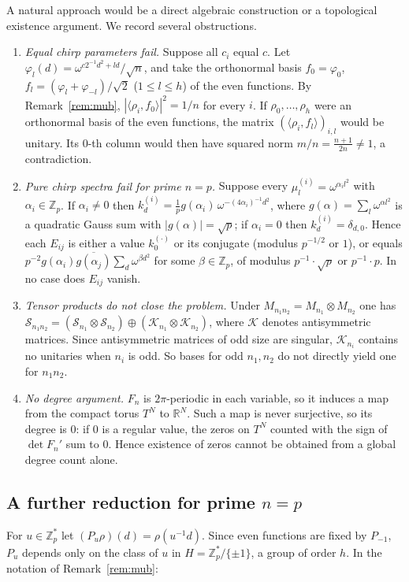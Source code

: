 \documentclass[11pt]{amsart}
\theoremstyle{definition}
\theoremstyle{remark}
\newcommand{\Z}{\mathbb{Z}}
\newcommand{\R}{\mathbb{R}}
\newcommand{\Sym}{\mathcal{S}}
\newcommand{\ip}[2]{\langle #1,#2\rangle}
\begin{document}
A natural approach would be a direct algebraic construction or a topological existence argument. We record several obstructions.

\begin{enumerate}
\item \emph{Equal chirp parameters fail.} Suppose all $c_i$ equal $c$. Let $\varphi_l(d)=\omega^{c2^{-1}d^2+ld}/\sqrt n$, and take the orthonormal basis $f_0=\varphi_0$, $f_l=(\varphi_l+\varphi_{-l})/\sqrt2$ ($1\le l\le h$) of the even functions. By Remark~\ref{rem:mub}, $|\ip{\rho_i}{f_0}|^2=1/n$ for every $i$. If $\rho_0,\dots,\rho_h$ were an orthonormal basis of the even functions, the matrix $(\ip{\rho_i}{f_l})_{i,l}$ would be unitary. Its $0$-th column would then have squared norm $m/n=\frac{n+1}{2n}\neq1$, a contradiction.
\item \emph{Pure chirp spectra fail for prime $n=p$.} Suppose every $\mu^{(i)}_l=\omega^{\alpha_il^2}$ with $\alpha_i\in\Z_p$. If $\alpha_i\ne0$ then $k^{(i)}_d=\frac1p g(\alpha_i)\,\omega^{-(4\alpha_i)^{-1}d^2}$, where $g(\alpha)=\sum_l\omega^{\alpha l^2}$ is a quadratic Gauss sum with $|g(\alpha)|=\sqrt p$; if $\alpha_i=0$ then $k^{(i)}_d=\delta_{d,0}$. Hence each $E_{ij}$ is either a value $k^{(\cdot)}_0$ or its conjugate (modulus $p^{-1/2}$ or $1$), or equals $p^{-2}g(\alpha_i)\overline{g(\alpha_j)}\sum_d\omega^{\beta d^2}$ for some $\beta\in\Z_p$, of modulus $p^{-1}\cdot\sqrt p$ or $p^{-1}\cdot p$. In no case does $E_{ij}$ vanish.
\item \emph{Tensor products do not close the problem.} Under $M_{n_1n_2}=M_{n_1}\otimes M_{n_2}$ one has $\Sym_{n_1n_2}=(\Sym_{n_1}\otimes\Sym_{n_2})\oplus(\mathcal K_{n_1}\otimes\mathcal K_{n_2})$, where $\mathcal K$ denotes antisymmetric matrices. Since antisymmetric matrices of odd size are singular, $\mathcal K_{n_i}$ contains no unitaries when $n_i$ is odd. So bases for odd $n_1,n_2$ do not directly yield one for $n_1n_2$.
\item \emph{No degree argument.} $F_n$ is $2\pi$-periodic in each variable, so it induces a map from the compact torus $T^N$ to $\R^N$. Such a map is never surjective, so its degree is $0$: if $0$ is a regular value, the zeros on $T^N$ counted with the sign of $\det F_n'$ sum to $0$. Hence existence of zeros cannot be obtained from a global degree count alone.
\end{enumerate}

\subsection{A further reduction for prime \texorpdfstring{$n=p$}{n=p}}
For $u\in\Z_p^*$ let $(P_u\rho)(d)=\rho(u^{-1}d)$. Since even functions are fixed by $P_{-1}$, $P_u$ depends only on the class of $u$ in $H=\Z_p^*/\{\pm1\}$, a group of order $h$. In the notation of Remark~\ref{rem:mub}:
\end{document}
